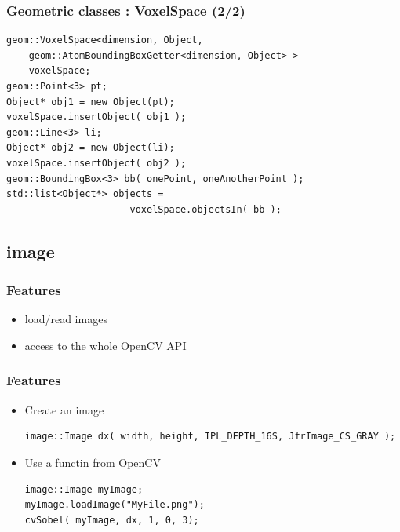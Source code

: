 \documentclass[compress]{beamer}
\begin{document}
\begin{frame}[fragile]
  \frametitle{Geometric classes : VoxelSpace (2/2)}

  \begin{lstlisting}
geom::VoxelSpace<dimension, Object,
    geom::AtomBoundingBoxGetter<dimension, Object> >
    voxelSpace;
geom::Point<3> pt;
Object* obj1 = new Object(pt);
voxelSpace.insertObject( obj1 );
geom::Line<3> li;
Object* obj2 = new Object(li);
voxelSpace.insertObject( obj2 );
geom::BoundingBox<3> bb( onePoint, oneAnotherPoint );
std::list<Object*> objects =
                      voxelSpace.objectsIn( bb );
  \end{lstlisting}

\end{frame}


\subsection{image}
\begin{frame}
  \frametitle{Features}
  \begin{itemize}
   \item<1-> load/read images
   \item<2-> access to the whole OpenCV API
  \end{itemize}
\end{frame}


\begin{frame}[fragile]
  \frametitle{Features}
  \begin{itemize}
   \item<1-> Create an image
\begin{lstlisting}
image::Image dx( width, height, IPL_DEPTH_16S, JfrImage_CS_GRAY );
\end{lstlisting}
    \item<2-> Use a functin from OpenCV
\begin{lstlisting}
image::Image myImage;
myImage.loadImage("MyFile.png");
cvSobel( myImage, dx, 1, 0, 3);
\end{lstlisting}
  \end{itemize}

\end{frame}
\end{document}
